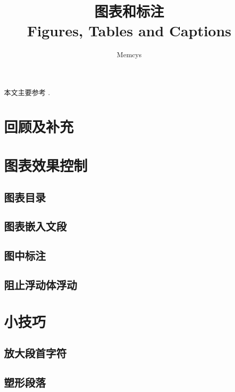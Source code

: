 \documentclass[]{ctexart}
\title{图表和标注 \\ Figures, Tables and Captions}
\author{Memcys}
\begin{document}
\maketitle

本文主要参考 \cite{wiki-floats}.

\setcounter{section}{-1}
\section{回顾及补充}


\section{}


\section{}


\section{}


\section{图表效果控制}
\subsection{图表目录}


\subsection{图表嵌入文段}


\subsection{}\label{sec:subfloats}


\subsection{图中标注}


\subsection{阻止浮动体浮动}


\section{小技巧}
\subsection{放大段首字符}


\subsection{塑形段落}


\printbibliography[title=参考资料]
\end{document}
